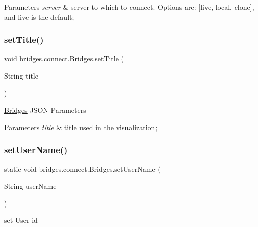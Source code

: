 \begin{DoxyParams}{Parameters}
{\em server} & server to which to connect. Options are\+: \mbox{[}\textquotesingle{}live\textquotesingle{}, \textquotesingle{}local\textquotesingle{}, \textquotesingle{}clone\textquotesingle{}\mbox{]}, and \textquotesingle{}live\textquotesingle{} is the default; \\
\hline
\end{DoxyParams}
\mbox{\label{classbridges_1_1connect_1_1_bridges_aed3752ee6318a48dff271d9a9e2a8fcc}} 
\subsubsection{\texorpdfstring{setTitle()}{setTitle()}}
{\footnotesize\ttfamily void bridges.\+connect.\+Bridges.\+set\+Title (\begin{DoxyParamCaption}\item[{String}]{title }\end{DoxyParamCaption})}

\mbox{\hyperlink{classbridges_1_1connect_1_1_bridges}{Bridges}} J\+S\+ON Parameters
\begin{DoxyParams}{Parameters}
{\em title} & title used in the visualization; \\
\hline
\end{DoxyParams}
\mbox{\label{classbridges_1_1connect_1_1_bridges_af9b9a2ca03ba02c0c2be4716594678a6}} 
\subsubsection{\texorpdfstring{setUserName()}{setUserName()}}
{\footnotesize\ttfamily static void bridges.\+connect.\+Bridges.\+set\+User\+Name (\begin{DoxyParamCaption}\item[{String}]{user\+Name }\end{DoxyParamCaption})\hspace{0.3cm}{\ttfamily [static]}}

set User id


